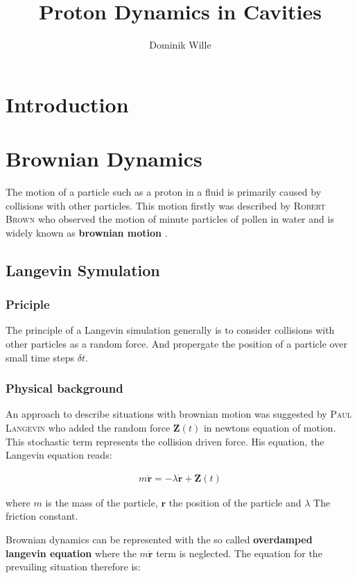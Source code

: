 \documentclass[a4paper, parskip=half]{scrartcl}
\title{Proton Dynamics in Cavities}
\author{Dominik Wille}
\newcommand{\person}[1]{%
	\textsc{#1}%
}
\newcommand{\effect}[1]{%
	\textbf{#1}%
}
\begin{document}
\maketitle
\thispagestyle{empty}
\newpage
\tableofcontents
\thispagestyle{empty}
\newpage
\setcounter{page}{1}

\section{Introduction}


\section{Brownian Dynamics}
The motion of a particle such as a proton in a fluid is primarily  caused by collisions with other particles. This motion firstly was described by \person{Robert Brown} who observed the motion of minute particles of pollen in water and is widely known as \effect{brownian motion}.
\subsection{Langevin Symulation}
\subsubsection{Priciple}
The principle of a Langevin simulation generally is to consider collisions with other particles as a random force. And propergate the position of a particle over small time steps $\delta t$.
\subsubsection{Physical background}
An approach to describe situations with brownian motion was suggested by \person{Paul Langevin} who added the random force $\mathbf{Z}(t)$ in newtons equation of motion. This stochastic term represents the collision driven force. His equation, the Langevin equation reads:

\begin{align}
m \ddot{\mathbf{r}} = -\lambda\dot{\mathbf{r}} + \mathbf{Z}(t)
\end{align}

where $m$ is the mass of the particle, $\mathbf{r}$ the position of the particle and $\lambda$ The friction constant.

Brownian dynamics can be represented with the so called \effect{overdamped langevin equation} where the $m \ddot{\mathbf{r}}$ term is neglected. The equation for the prevailing situation therefore is:
\end{document}

